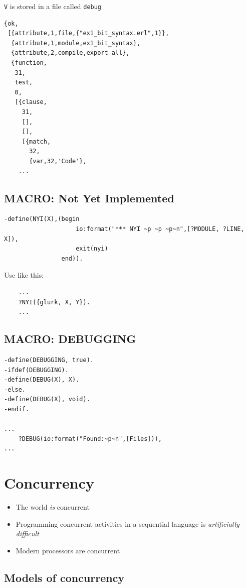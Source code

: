 \documentclass[12pt]{article}
\begin{document}
\verb+V+ is stored in a file called \verb+debug+

\begin{verbatim}
{ok,
 [{attribute,1,file,{"ex1_bit_syntax.erl",1}},
  {attribute,1,module,ex1_bit_syntax},
  {attribute,2,compile,export_all},
  {function,
   31,
   test,
   0,
   [{clause,
     31,
     [],
     [],
     [{match,
       32,
       {var,32,'Code'},
    ...
\end{verbatim}

\subsection{MACRO: Not Yet Implemented}

\begin{verbatim}
-define(NYI(X),(begin 
                    io:format("*** NYI ~p ~p ~p~n",[?MODULE, ?LINE, X]),
                    exit(nyi) 
                end)).
\end{verbatim}

Use like this:

\begin{verbatim}
    ...
    ?NYI({glurk, X, Y}).
    ...
\end{verbatim}

\subsection{MACRO: DEBUGGING}

\begin{verbatim}
-define(DEBUGGING, true).
-ifdef(DEBUGGING).
-define(DEBUG(X), X).
-else.
-define(DEBUG(X), void).
-endif.

...
    ?DEBUG(io:format("Found:~p~n",[Files])),
...
\end{verbatim}
 
\section{Concurrency}

\begin{itemize}        
\item The world {\sl is} concurrent
\item Programming concurrent activities in a sequential language is
{\sl artificially difficult}
\item Modern processors are concurrent
\end{itemize}


\subsection{Models of concurrency}
\end{document}
